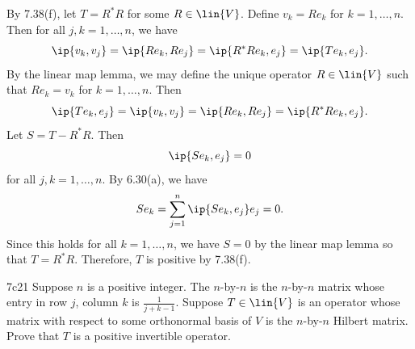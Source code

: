 \begin{soliff}
    \rightimp By 7.38(f), let $T = R^\ast R$ for some $R \in \lin{V}$. 
    Define $v_k = R e_k$ for $k = 1, \ldots, n$. 
    Then for all $j, k = 1, \ldots, n$, we have
    \[
        \ip{v_k, v_j} = \ip{R e_k, R e_j} = \ip{R^\ast R e_k, e_j} = \ip{T e_k, e_j}.
    \]
    \leftimp By the linear map lemma, we may define the unique operator $R \in \lin{V}$ such that $R e_k = v_k$ for $k = 1, \ldots, n$.
    Then
    \[
        \ip{T e_k, e_j} = \ip{v_k, v_j} = \ip{R e_k, R e_j} = \ip{R^\ast R e_k, e_j}.
    \]
    Let $S = T - R^\ast R$.
    Then
    \[
        \ip{S e_k, e_j} = 0
    \]
    for all $j, k = 1, \ldots, n$.
    By 6.30(a), we have
    \[
        S e_k = \sum_{j=1}^n \ip{S e_k, e_j} e_j = 0.
    \]
    Since this holds for all $k = 1, \ldots, n$, we have $S = 0$ by the linear map lemma so that $T = R^\ast R$.
    Therefore, $T$ is positive by 7.38(f).
\end{soliff}

\begin{exercise}{7c21}
    Suppose $n$ is a positive integer.
    The $n$-by-$n$  is the $n$-by-$n$ matrix whose entry in row $j$, column $k$ is $\frac{1}{j+k-1}$.
    Suppose $T \in \lin{V}$ is an operator whose matrix with respect to some orthonormal basis of $V$ is the $n$-by-$n$ Hilbert matrix.
    Prove that $T$ is a positive invertible operator.

\end{exercise}

